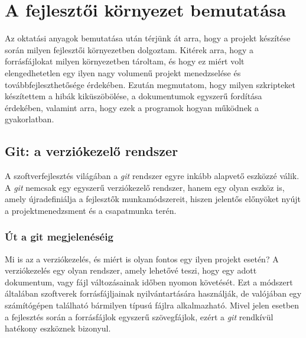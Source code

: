 \cleardoublepage
\chapter{A fejlesztői környezet bemutatása}

Az oktatási anyagok bemutatása után térjünk át arra, hogy a projekt készítése
során milyen fejlesztői környezetben dolgoztam. Kitérek arra, hogy a
forrásfájlokat milyen környezetben tároltam, és hogy ez miért volt
elengedhetetlen egy ilyen nagy volumenű projekt menedzselése és
továbbfejleszthetősége érdekében. Ezután megmutatom, hogy milyen szkripteket
készítettem a hibák kiküszöbölése, a dokumentumok egyszerű fordítása érdekében,
valamint arra, hogy ezek a programok hogyan működnek a gyakorlatban.


\section{Git: a verziókezelő rendszer}

A szoftverfejlesztés világában a \textit{git} rendszer egyre inkább alapvető
eszközzé válik. A \textit{git} nemcsak egy egyszerű verziókezelő rendszer,
hanem egy olyan eszköz is, amely újradefiniálja a fejlesztők munkamódszereit,
hiszen jelentős előnyöket nyújt a projektmenedzsment és a csapatmunka terén.

\subsection{Út a git megjelenéséig}

Mi is az a verziókezelés, és miért is olyan fontos egy ilyen projekt esetén?
A verziókezelés egy olyan rendszer, amely lehetővé teszi, hogy egy adott
dokumentum, vagy fájl változásainak időben nyomon követését. Ezt a módszert
általában szoftverek forrásfájljainak nyilvántartására használják, de valójában
egy számítógépen található bármilyen típusú fájlra alkalmazható. Mivel jelen
esetben a fejlesztés során a forrásfájlok egyszerű szövegfájlok, ezért a
\textit{git} rendkívül hatékony eszköznek bizonyul.

